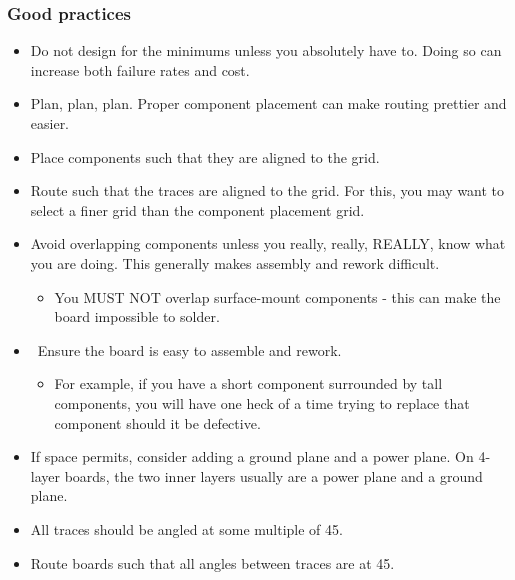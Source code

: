 \documentclass[letterpaper]{article}
\newcommand\liststyleRTFNumvii{%
\renewcommand\labelitemi{{\textbullet}}
\renewcommand\labelitemii{o}
\renewcommand\labelitemiii{${\blacksquare}$}
\renewcommand\labelitemiv{{\textbullet}}
}
\begin{document}
\subsubsection{Good practices}
\hypertarget{Toc337742685}{}\liststyleRTFNumvii
\begin{itemize}
\item {\sffamily\color[rgb]{0.30980393,0.5058824,0.7411765}
Do not design for the minimums unless you absolutely have to. Doing so can increase both failure rates and cost.}
\item {\sffamily\color[rgb]{0.30980393,0.5058824,0.7411765}
Plan, plan, plan. Proper component placement can make routing prettier and easier.}
\item {\sffamily\color[rgb]{0.30980393,0.5058824,0.7411765}
Place components such that they are aligned to the grid.}
\item {\sffamily\color[rgb]{0.30980393,0.5058824,0.7411765}
Route such that the traces are aligned to the grid. For this, you may want to select a finer grid than the component
placement grid.}
\item {\sffamily\color[rgb]{0.30980393,0.5058824,0.7411765}
Avoid overlapping components unless you really, really, REALLY, know what you are doing. This generally makes assembly
and rework difficult.}

\begin{itemize}
\item {\sffamily\color[rgb]{0.30980393,0.5058824,0.7411765}
You MUST NOT overlap surface-mount components - this can make the board impossible to solder.}
\end{itemize}
\item {\sffamily\color[rgb]{0.30980393,0.5058824,0.7411765}
\ Ensure the board is easy to assemble and rework.}

\begin{itemize}
\item {\sffamily\color[rgb]{0.30980393,0.5058824,0.7411765}
For example, if you have a short component surrounded by tall components, you will have one heck of a time trying to
replace that component should it be defective.}
\end{itemize}
\item {\sffamily\color[rgb]{0.30980393,0.5058824,0.7411765}
If space permits, consider adding a ground plane and a power plane. On 4-layer boards, the two inner layers usually are
a power plane and a ground plane.}
\item {\sffamily\color[rgb]{0.30980393,0.5058824,0.7411765}
All traces should be angled at some multiple of 45{\textdegree}.}
\item {\sffamily\color[rgb]{0.30980393,0.5058824,0.7411765}
Route boards such that all angles between traces are at 45{\textdegree}.}


\end{itemize}
\end{document}
